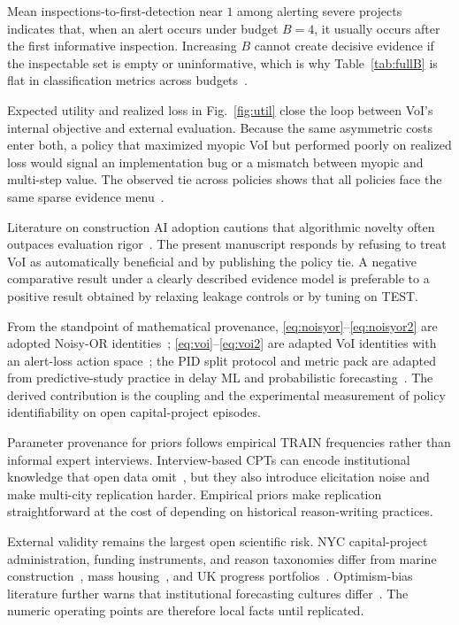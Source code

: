 Mean inspections-to-first-detection near $1$ among alerting severe projects indicates that, when an alert occurs under budget $B{=}4$, it usually occurs after the first informative inspection. Increasing $B$ cannot create decisive evidence if the inspectable set is empty or uninformative, which is why Table~\ref{tab:fullB} is flat in classification metrics across budgets~\cite{Fauriat2020,Yuan2021}.

Expected utility and realized loss in Fig.~\ref{fig:util} close the loop between VoI's internal objective and external evaluation. Because the same asymmetric costs enter both, a policy that maximized myopic VoI but performed poorly on realized loss would signal an implementation bug or a mismatch between myopic and multi-step value. The observed tie across policies shows that all policies face the same sparse evidence menu~\cite{Howard1966,Memarzadeh2016}.

Literature on construction AI adoption cautions that algorithmic novelty often outpaces evaluation rigor~\cite{Darko2020,PanYZhang2021,Abioye2021,Regona2024}. The present manuscript responds by refusing to treat VoI as automatically beneficial and by publishing the policy tie. A negative comparative result under a clearly described evidence model is preferable to a positive result obtained by relaxing leakage controls or by tuning on TEST.

From the standpoint of mathematical provenance, \eqref{eq:noisyor}--\eqref{eq:noisyor2} are adopted Noisy-OR identities~\cite{Heckerman1996,Onisko2001}; \eqref{eq:voi}--\eqref{eq:voi2} are adapted VoI identities with an alert-loss action space~\cite{Howard1966,Song2021,Memarzadeh2016}; the PID split protocol and metric pack are adapted from predictive-study practice in delay ML and probabilistic forecasting~\cite{Egwim2021,Tagharobi2025,Gneiting2007,Vickers2006}. The derived contribution is the coupling and the experimental measurement of policy identifiability on open capital-project episodes.

Parameter provenance for priors follows empirical TRAIN frequencies rather than informal expert interviews. Interview-based CPTs can encode institutional knowledge that open data omit~\cite{Khodabakhshian2025,Luu2009}, but they also introduce elicitation noise and make multi-city replication harder. Empirical priors make replication straightforward at the cost of depending on historical reason-writing practices.

External validity remains the largest open scientific risk. NYC capital-project administration, funding instruments, and reason taxonomies differ from marine construction~\cite{Comu2023}, mass housing~\cite{Khodabakhshian2025}, and UK progress portfolios~\cite{Tagharobi2025}. Optimism-bias literature further warns that institutional forecasting cultures differ~\cite{Flyvbjerg2009,Love2015}. The numeric operating points are therefore local facts until replicated.


